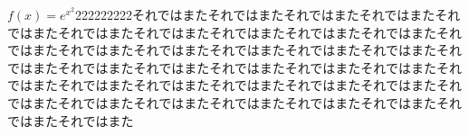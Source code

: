 \documentclass{jarticle}
\begin{document}
$f(x)=e^{x^2}$222222222それではまたそれではまたそれではまたそれではまたそれではまたそれではまたそれではまたそれではまたそれではまたそれではまたそれではまたそれではまたそれではまたそれではまたそれではまたそれではまたそれではまたそれではまたそれではまたそれではまたそれではまたそれではまたそれではまたそれではまたそれではまたそれではまたそれではまたそれではまたそれではまたそれではまたそれではまたそれではまたそれではまたそれではまたそれではまたそれではまた
\end{document}
